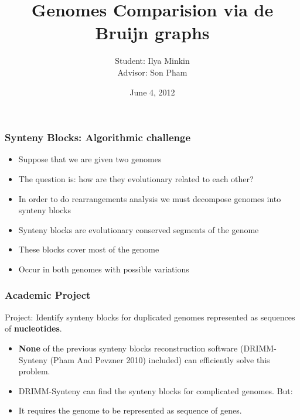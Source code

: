 \documentclass[svgnames,14pt]{beamer}
\title{Genomes Comparision via de Bruijn graphs}
\author{Student: Ilya Minkin \\ Advisor: Son Pham}
\institute{St. Petersburg Academic University}
\date{June 4, 2012}
\begin{document}
\def\braces#1{[#1]}
\newenvironment{changemargin}[2]{%
  \begin{list}{}{%
    \setlength{\topsep}{0pt}%
    \setlength{\leftmargin}{#1}%
    \setlength{\rightmargin}{#2}%
    \setlength{\listparindent}{\parindent}%
    \setlength{\itemindent}{\parindent}%
    \setlength{\parsep}{\parskip}%
  }%
  \item[]}{\end{list}}
\maketitle

\begin{frame}
\frametitle{Synteny Blocks: Algorithmic challenge}
\begin{itemize}
\item Suppose that we are given two genomes
\item The question is: how are they evolutionary related to each other?
\item In order to do rearrangements analysis we must decompose genomes into synteny blocks
\item Synteny blocks are evolutionary conserved segments of the genome
\item These blocks cover most of the genome
\item Occur in both genomes with possible variations
\end{itemize}
\end{frame}

\begin{frame}
\frametitle{Academic Project}
Project: Identify synteny blocks for duplicated genomes represented as sequences of \textbf{nucleotides}.
\begin{itemize}
\item \textbf{None} of the previous synteny blocks reconstruction software (DRIMM-Synteny (Pham And Pevzner 2010) included) can 
efficiently solve this problem. 
\item DRIMM-Synteny can find the synteny blocks for complicated genomes. But:
\pause \item It requires the genome to be represented as sequence of genes. 
\end{itemize}
\end{frame}
\end{document}
